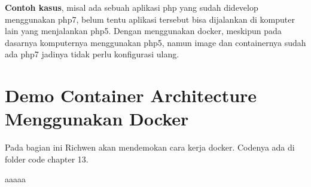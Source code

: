 \textbf{Contoh kasus}, misal ada sebuah aplikasi php yang sudah didevelop menggunakan php7, belum tentu aplikasi tersebut bisa dijalankan di komputer lain yang menjalankan php5. Dengan menggunakan docker, meskipun pada dasarnya komputernya menggunakan php5, namun image dan containernya sudah ada php7 jadinya tidak perlu konfigurasi ulang.

\section{Demo Container Architecture Menggunakan Docker}
Pada bagian ini Richwen akan mendemokan cara kerja docker. Codenya ada di folder code chapter 13.

aaaaa

